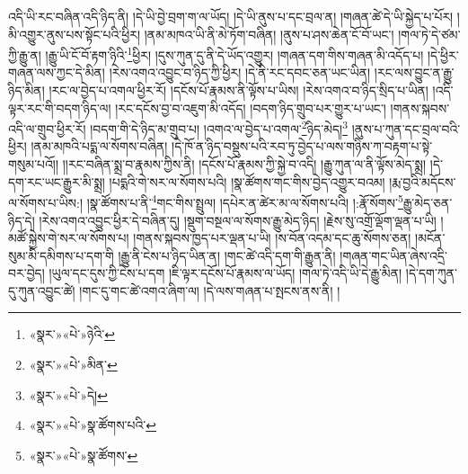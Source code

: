 འདི་ཡི་རང་བཞིན་འདི་ཉིད་ནི། །དེ་ཡི་བྱེ་བྲག་ག་ལ་ཡོད། །དེ་ཡི་ནུས་པ་དང་བྲལ་ན། །གཞན་ཚེ་དེ་ཡི་སྐྱེད་པ་པོར། །མི་འགྱུར་ནུས་པས་སྟོང་པའི་ཕྱིར། །ནམ་མཁའ་ཡི་ནི་མེ་ཏོག་བཞིན། །ནུས་པ་ཤས་ཆེན་ངོ་བོ་ཡང་། །གལ་ཏེ་དེ་ཙམ་ཀྱི་རྒྱུ་ན། །རྒྱུ་ཡི་ངོ་བོ་རྟག་ཉིའི་\footnote{«སྣར་»«པེ་»ཉེའི་}ཕྱིར། །དུས་ཀུན་དུ་ནི་དེ་ཡོད་འགྱུར། །གཞན་དག་གིས་གཞན་མི་འདོད་པ། །དེ་ཕྱིར་གཞན་ལས་ཀྱང་དེ་མིན། །རེས་འགའ་འབྱུང་བ་ཉིད་ཀྱི་ཕྱིར། །དེ་ནི་རང་དབང་ཅན་ཡང་ཡིན། །རང་ལས་བྱུང་ན་རྒྱུ་ཉིད་མིན། །རང་ལ་བྱེད་པ་འགལ་ཕྱིར་རོ། །དངོས་པོ་རྣམས་ནི་ལྟོས་པ་ཡིས། །རེས་འགའ་བ་ཉིད་སྲིད་པ་ཡིན། །འདི་ལྟར་རང་གི་བདག་ཉིད་ལ། །རང་དངོས་བྱ་བ་འཇུག་མི་འདོད། །བདག་ཉིད་གྲུབ་པར་གྱུར་པ་ཡང་། །གནས་སྐབས་འདི་ལ་གྲུབ་ཕྱིར་རོ། །བདག་གི་དེ་ཉིད་མ་གྲུབ་པ། །འགའ་ལ་བྱེད་པ་འགལ་\footnote{«སྣར་»«པེ་»མིན་}ཉིད་མེད།\footnote{«སྣར་»«པེ་»དེ།} །ནུས་པ་ཀུན་དང་བྲལ་བའི་ཕྱིར། །ནམ་མཁའི་པདྨ་ལ་སོགས་བཞིན། །དེ་ཁོ་ན་ཉིད་བསྡུས་པའི་རབ་ཏུ་བྱེད་པ་ལས་གཉིས་ཀ་བརྟག་པ་སྟེ་གསུམ་པའོ།། །།རང་བཞིན་སྨྲ་བ་རྣམས་ཀྱིས་ནི། །དངོས་པོ་རྣམས་ཀྱི་སྐྱེ་བ་འདི། །རྒྱུ་ཀུན་ལ་ནི་ལྟོས་མེད་སྨྲ། །དེ་དག་རང་ཡང་རྒྱུར་མི་སྨྲ། །པདྨའི་གེ་སར་ལ་སོགས་པའི། །སྣ་ཚོགས་གང་གིས་བྱེད་འགྱུར་བའམ། །རྨ་བྱའི་མདོངས་ལ་སོགས་པ་ཡིས:། །སྣ་ཚོགས་པ་ནི་\footnote{«སྣར་»«པེ་»སྣ་ཚོགས་པའི་}གང་གིས་སྤྲུལ། །དཔེར་ན་ཚེར་མ་ལ་སོགས་པའི། །:རྣོ་སོགས་\footnote{«སྣར་»«པེ་»སྣ་ཚོགས་}རྒྱུ་མེད་ཅན་ཉིད་དེ། །རེས་འགའ་འབྱུང་ཕྱིར་དེ་བཞིན་དུ། །སྡུག་བསྔལ་ལ་སོགས་རྒྱུ་མེད་ཉིད། །རྗེས་སུ་འགྲོ་ལྡོག་ལྡན་པ་ཡི། །མཚོ་སྐྱེས་གེ་སར་ལ་སོགས་པ། །གནས་སྐབས་ཁྱད་པར་ལྡན་པ་ཡི། །ས་བོན་འདམ་དང་ཆུ་སོགས་ཅན། །མངོན་སུམ་མི་དམིགས་པ་དག་གི །རྒྱུ་ནི་ངེས་པ་ཉིད་ཡིན་ན། །གང་ཚེ་འདི་དག་གི་རྒྱུན་ནི། །གཞན་གང་ཡིན་ཞེས་འདྲི་བར་བྱེད། །ཡུལ་དང་དུས་ཀྱི་ངེས་པ་དག །ཇི་ལྟར་དངོས་པོ་རྣམས་ལ་ཡོད། །གལ་ཏེ་འདི་ཡི་དེ་རྒྱུ་མིན། །དེ་དག་ཀུན་དུ་ཀུན་འབྱུང་ཚེ། །གང་དུ་གང་ཚེ་འགའ་ཞིག་ལ། །དེ་ལས་གཞན་པ་སྤངས་ནས་ནི། །
